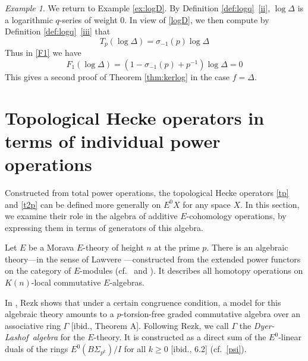 \documentclass{gtpart}
\theoremstyle{definition}
\theoremstyle{remark}
\newtheorem{ex}[thm]{Example}
\newcommand{\DL}{Dyer-Lashof~}
\renewcommand{\D}{\Delta}
\newcommand{\G}{\Gamma}
\newcommand{\si}{\sigma}
\renewcommand{\=}{\approx}
\renewcommand{\-}{\sim}
\numberwithin{equation}{section}
\numberwithin{thm}{section}
\begin{document}
\begin{ex}
 \label{ex:pf}
 We return to Example \ref{ex:logD}.  
 By Definition \ref{def:logq}~\!\eqref{ii}, $\log \D$ is a logarithmic $q$-series of weight 0.  
 In view of \eqref{logD}, we then compute by Definition \ref{def:logq}~\!\eqref{iii} that 
 \[
  T_p (\log \D) = \si_{-1}(p) \log \D 
 \]
 Thus in \eqref{F1} we have 
 \[
  F_1 (\log \D) = \left( 1 - \si_{-1}(p) + p^{-1} \right) \log \D = 0 
 \]
 This gives a second proof of Theorem \ref{thm:kerlog} in the case $f = \D$.  
\end{ex}



\section{Topological Hecke operators in terms of individual power operations}
\label{sec:individual}

Constructed from total power operations, the topological Hecke operators \eqref{tp} and \eqref{t2p} 
can be defined more generally on $E^0 X$ for any space $X$.  
In this section, we examine their role in the algebra of additive $E$-cohomology operations, 
by expressing them in terms of generators of this algebra.  

Let $E$ be a Morava $E$-theory of height $n$ at the prime $p$.  
There is an algebraic theory---in the sense of Lawvere \cite{Lawvere}---constructed 
from the extended power functors on the category of $E$-modules 
(cf.~\cite[Section 9]{lpo} and \cite[Section 4]{cong}).  
It describes all homotopy operations on $K(n)$-local commutative $E$-algebras.  

In \cite{cong}, Rezk shows that under a certain congruence condition, 
a model for this algebraic theory 
amounts to a $p$-torsion-free graded commutative algebra over an associative ring $\G$ [ibid., Theorem A].  
Following Rezk, we call $\G$ the {\em \DL algebra} for the $E$-theory.  
It is constructed as a direct sum of the $E^0$-linear duals of the rings $E^0(B\Sigma_{p^k}) / I$ for all $k \geq 0$ [ibid., 6.2] (cf.~\eqref{psi}).  
\end{document}
